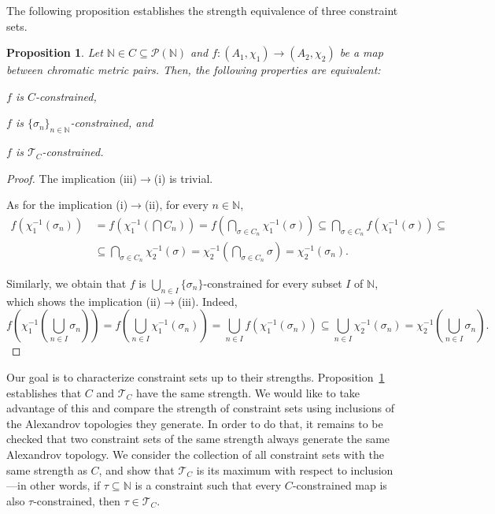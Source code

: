 \documentclass[8pt,a4paper,oneside,english,english]{article}
\theoremstyle{plain}
\theoremstyle
{plain}
\newtheorem{proposition}[theorem]{Proposition}%
\theoremstyle{definition}
\newcommand{\N}{\mathbb{N}}
\newcommand{\Tau}{\mathcal T}
\newcommand{\MP}[1]{(A_{#1},\chi_{#1})}
\begin{document}
The following proposition establishes the strength equivalence of three constraint sets.
 
\begin{proposition}\label{prop:C-constrained_iff_TC-constrained}
    Let $\N\in C\subseteq\mathcal P(\N)$ and  
    $f\colon\MP{1}\to\MP{2}$ be a map between chromatic metric pairs. Then, the following properties are equivalent:
    \begin{compactenum}[(i)]
        \item $f$ is $C$-constrained, 
        \item $f$ is $\{\sigma_n\}_{n\in\N}$-constrained, and
        \item $f$ is $\Tau_C$-constrained.
    \end{compactenum}
\end{proposition}
\begin{proof}
    The implication (iii)$\to$(i) is trivial.

    As for the implication (i)$\to$(ii), for every $n\in\N$,
    \[
        \begin{aligned}
        f(\chi_1^{-1}(\sigma_n))&\,=f(\chi_1^{-1}(\bigcap C_n)) =
        f(\bigcap_{\sigma\in C_n}\chi_1^{-1}(\sigma)) \subseteq
        \bigcap_{\sigma\in C_n}f(\chi_1^{-1}(\sigma)) \subseteq\\
        &\,\subseteq
        \bigcap_{\sigma\in C_n}\chi_2^{-1}(\sigma) =
        \chi_2^{-1}(\bigcap_{\sigma\in C_n}\sigma)=\chi_2^{-1}(\sigma_n).
        \end{aligned}
    \]
    
    Similarly, we obtain that $f$ is $\bigcup_{n\in I}\{\sigma_n\}$-constrained for every subset $I$ of $\N$, which shows the implication (ii)$\to$(iii). Indeed,
    \begin{equation}\label{eq:C-constrained_iff_TC-constrained}
        f(\chi_1^{-1}(\bigcup_{n\in I}\sigma_n)) =
        f(\bigcup_{n\in I}\chi_1^{-1}(\sigma_n)) =
        \bigcup_{n\in I}f(\chi_1^{-1}(\sigma_n)) \subseteq
        \bigcup_{n\in I}\chi_2^{-1}(\sigma_n) =
        \chi_2^{-1}(\bigcup_{n\in I}\sigma_n).
    \end{equation}
\end{proof}

Our goal is to characterize constraint sets up to their strengths. Proposition~\ref{prop:C-constrained_iff_TC-constrained} establishes that $C$ and $\Tau_C$ have the same strength. We would like to take advantage of this and compare the strength of constraint sets using inclusions of the Alexandrov topologies they generate. In order to do that, it remains to be checked that two constraint sets of the same strength always generate the same Alexandrov topology.
We consider the collection of all constraint sets with the same strength as $C$, and show that $\Tau_C$ is its maximum with respect to inclusion---in other words, if $\tau\subseteq\N$ is a constraint such that every $C$-constrained map is also $\tau$-constrained, then $\tau\in\Tau_C$.
\end{document}
